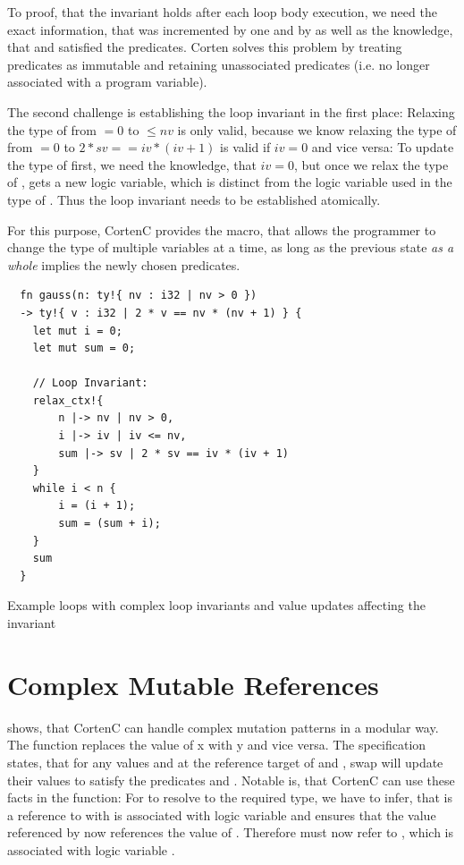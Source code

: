 \documentclass[twoside, english]{sdqthesis}
\theoremstyle{definition}
\begin{document}
To proof, that the invariant holds after each loop body execution, we need the exact information, that  was incremented by one and  by  as well as the knowledge, that  and  satisfied the predicates. Corten solves this problem by treating predicates as immutable and retaining unassociated predicates (i.e. no longer associated with a program variable).

The second challenge is establishing the loop invariant in the first place: Relaxing the type of  from $= 0$ to $\leq nv$ is only valid, because we know relaxing the type of  from $= 0$ to $ 2 * sv == iv * (iv + 1)$ is valid if $iv = 0$ and vice versa: To update the type of  first, we need the knowledge, that $iv = 0$, but once we relax the type of ,  gets a new logic variable, which is distinct from the logic variable used in the type of . Thus the loop invariant needs to be established atomically.

For this purpose, CortenC provides the  macro, that allows the programmer to change the type of multiple variables at a time, as long as the previous state \textit{as a whole} implies the newly chosen predicates.

\begin{listing}[ht]
  \begin{verbatim}
  fn gauss(n: ty!{ nv : i32 | nv > 0 }) 
  -> ty!{ v : i32 | 2 * v == nv * (nv + 1) } {
    let mut i = 0;
    let mut sum = 0;
    
    // Loop Invariant:
    relax_ctx!{
        n |-> nv | nv > 0,
        i |-> iv | iv <= nv,
        sum |-> sv | 2 * sv == iv * (iv + 1)
    }
    while i < n {
        i = (i + 1);
        sum = (sum + i);
    }
    sum
  }
  \end{verbatim}
  \caption{Example loops with complex loop invariants and value updates affecting the invariant}
  \label{lst:gauss}
\end{listing}

\label{subsec:evaluation-complex-mutable-ref}\section{Complex Mutable References}

 shows, that CortenC can handle complex mutation patterns in a modular way. 
The  function replaces the value of x with y and vice versa. The specification states, that for any values  and  at the reference target of  and , swap will update their values to satisfy the predicates  and .
Notable is, that CortenC can use these facts in the  function: For  to resolve to the required type, we have to infer, that  is a reference to  with is associated with logic variable  and  ensures that the value referenced by  now references the value of . Therefore  must now refer to , which is associated with logic variable .
\end{document}
